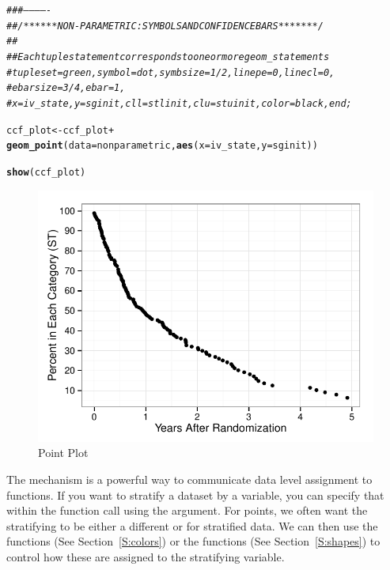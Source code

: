 \documentclass[nojss]{jss}\usepackage[]{graphicx}\usepackage[]{color}
\makeatletter
\def\maxwidth{ %
  \ifdim\Gin@nat@width>\linewidth
    \linewidth
  \else
    \Gin@nat@width
  \fi
}
\newcommand{\hlcom}[1]{\textcolor[rgb]{0.678,0.584,0.686}{\textit{#1}}}%
\newcommand{\hlopt}[1]{\textcolor[rgb]{0,0,0}{#1}}%
\newcommand{\hlstd}[1]{\textcolor[rgb]{0.345,0.345,0.345}{#1}}%
\newcommand{\hlkwb}[1]{\textcolor[rgb]{0.69,0.353,0.396}{#1}}%
\newcommand{\hlkwc}[1]{\textcolor[rgb]{0.333,0.667,0.333}{#1}}%
\newcommand{\hlkwd}[1]{\textcolor[rgb]{0.737,0.353,0.396}{\textbf{#1}}}%
\newenvironment{kframe}{%
 \def\at@end@of@kframe{}%
 \ifinner\ifhmode%
  \def\at@end@of@kframe{\end{minipage}}%
  \begin{minipage}{\columnwidth}%
 \fi\fi%
 \def\FrameCommand##1{\hskip\@totalleftmargin \hskip-\fboxsep
 \colorbox{shadecolor}{##1}\hskip-\fboxsep
     \hskip-\linewidth \hskip-\@totalleftmargin \hskip\columnwidth}%
 \MakeFramed {\advance\hsize-\width
   \@totalleftmargin\z@ \linewidth\hsize
   \@setminipage}}%
 {\par\unskip\endMakeFramed%
 \at@end@of@kframe}
\newenvironment{knitrout}{}{} %
\makeatother
\begin{document}
\begin{knitrout}\footnotesize
{}\color{fgcolor}\begin{kframe}
\begin{alltt}
\hlcom{###-------------}
\hlcom{## /******NON-PARAMETRIC: SYMBOLS AND CONFIDENCE BARS *******/}
\hlcom{##}
\hlcom{## Each tuple statement corresponds to one or more geom_ statements}
\hlcom{#     tuple set=green, symbol=dot, symbsize=1/2, linepe=0, linecl=0,}
\hlcom{#       ebarsize=3/4, ebar=1,}
\hlcom{#       x=iv_state, y=sginit, cll=stlinit, clu=stuinit, color=black, end;}

\hlstd{ccf_plot} \hlkwb{<-} \hlstd{ccf_plot} \hlopt{+}
  \hlkwd{geom_point}\hlstd{(}\hlkwc{data}\hlstd{=nonparametric,} \hlkwd{aes}\hlstd{(}\hlkwc{x}\hlstd{=iv_state,} \hlkwc{y}\hlstd{=sginit))}

\hlkwd{show}\hlstd{(ccf_plot)}
\end{alltt}
\end{kframe}\begin{figure}[htpb]


{\centering \includegraphics[width=\maxwidth]{figure/beamer-points} 

}

\caption[Point Plot]{Point Plot\label{F:points}}
\end{figure}


\end{knitrout}
The  mechanism is a powerful way to communicate data level assignment to  functions. If you want to stratify a dataset by a variable, you can specify that within the  function call using the  argument. For points, we often want the stratifying to be either a different  or  for stratified data. We can then use the  functions (See Section~\ref{S:colors}) or the  functions (See Section~\ref{S:shapes}) to control how these are assigned to the stratifying variable.
\end{document}
